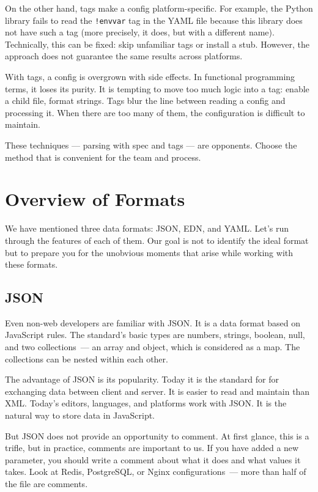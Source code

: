 On the other hand, tags make a config platform-specific. For example, the Python library fails to read the \verb|!envvar| tag in the YAML file because this library does not have such a tag (more precisely, it does, but with a different name). Technically, this can be fixed: skip unfamiliar tags or install a stub. However, the approach does not guarantee the same results across platforms.

With tags, a config is overgrown with side effects. In functional programming terms, it loses its purity. It is tempting to move too much logic into a tag: enable a child file, format strings. Tags blur the line between reading a config and processing it. When there are too many of them, the configuration is difficult to maintain.

These techniques — parsing with spec and tags — are opponents. Choose the method that is convenient for the team and process.

\section{Overview of Formats}

We have mentioned three data formats: JSON, EDN, and YAML. Let's run through the features of each of them.  Our goal is not to identify the ideal format but to prepare you for the unobvious moments that arise while working with these formats.

\subsection{JSON}


Even non-web developers are familiar with JSON. It is a data format based on JavaScript rules. The standard's basic types are numbers, strings, boolean, null, and two collections~--- an array and object, which is considered as a map. The collections can be nested within each other.


The advantage of JSON is its popularity. Today it is the standard for for exchanging data between client and server.  It is easier to read and maintain than XML. Today's editors, languages, and platforms work with JSON. It is the natural way to store data in JavaScript.

But JSON does not provide an opportunity to comment. At first glance, this is a trifle, but in practice, comments are important to us. If you have added a new parameter, you should write a comment about what it does and what values it takes. Look at Redis, PostgreSQL, or Nginx configurations~--- more than half of the file are comments.

